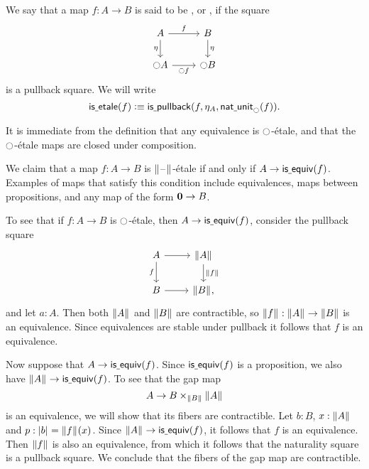 \documentclass[9pt,twosided]{amsart}
\begin{document}
\begin{defn}
We say that a map $f:A\to B$ is said to be , or , if the square
\begin{equation*}
\begin{tikzcd}
A \arrow[r,"f"] \arrow[d,swap,"\eta"] & B \arrow[d,"\eta"] \\
\modal A \arrow[r,swap,"\modal f"] & \modal B
\end{tikzcd}
\end{equation*}
is a pullback square. We will write
\begin{equation*}
\mathsf{is\underline{\ }{}etale}(f)\vcentcolon\equiv\mathsf{is\underline{\ }{}pullback}(f,\eta_A,\mathsf{nat\underline{\ }{}unit}_{\ocircle}(f)).
\end{equation*}
\end{defn}

It is immediate from the definition that any equivalence is ${\ocircle}$-\'etale, and that the ${\ocircle}$-\'etale maps are closed under composition.

\begin{eg}\label{eg:etale_prop}
We claim that a map $f:A\to B$ is $\brck{\blank}$-\'etale if and only if $A\to \mathsf{is\underline{\ }{}equiv}(f)$. Examples of maps that satisfy this condition include equivalences, maps between propositions, and any map of the form $\mathbf{0}\to B$.

To see that if $f:A\to B$ is ${\ocircle}$-\'etale, then $A\to\mathsf{is\underline{\ }{}equiv}(f)$, consider the pullback square
\begin{equation*}
\begin{tikzcd}
A \arrow[r] \arrow[d,swap,"f"] & \brck{A} \arrow[d,"\brck{f}"] \\
B \arrow[r] & \brck{B},
\end{tikzcd}
\end{equation*}
and let $a:A$. Then both $\brck{A}$ and $\brck{B}$ are contractible, so $\brck{f}:\brck{A}\to\brck{B}$ is an equivalence. Since equivalences are stable under pullback it follows that $f$ is an equivalence.

Now suppose that $A\to \mathsf{is\underline{\ }{}equiv}(f)$. Since $\mathsf{is\underline{\ }{}equiv}(f)$ is a proposition, we also have $\brck{A}\to\isequiv(f)$. To see that the gap map
\begin{equation*}
A \to B\times_{\brck{B}}\brck{A}
\end{equation*}
is an equivalence, we will show that its fibers are contractible. Let $b:B$, $x:\brck{A}$ and $p:\bproj{b}=\brck{f}(x)$. Since $\brck{A}\to\isequiv(f)$, it follows that $f$ is an equivalence. Then $\brck{f}$ is also an equivalence, from which it follows that the naturality square is a pullback square. We conclude that the fibers of the gap map are contractible. 
\end{eg}
\end{document}
